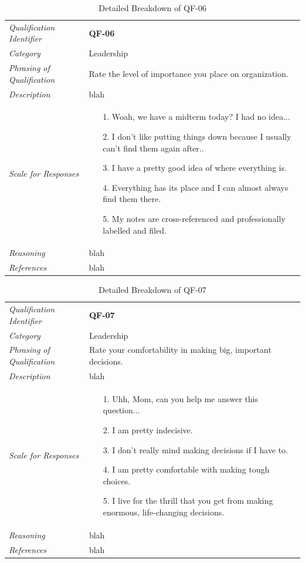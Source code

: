 \documentclass[12pt,letterpaper]{article}
\begin{document}
\begin{table}[H]
	\caption{Detailed Breakdown of QF-06}
	\begin{tabu} to 
		\toprule
		Qualification Identifier & {\bf QF-06}\\
		Category & Leadership \\
		Phrasing of Qualification & Rate the level of importance you place on organization.\\
		Description & blah\\
		Scale for Responses &
		\begin{minipage}[t]{\linewidth}
			\begin{enumerate}
				\item[1.] Woah, we have a midterm today? I had no idea...
				\item[2.] I don't like putting things down because I usually can't find them again after..
				\item[3.] I have a pretty good idea of where everything is.
				\item[4.] Everything has its place and I can almost always find them there.
				\item[5.] My notes are cross-referenced and professionally labelled and filed.
			\end{enumerate}
		\end{minipage}\\
		Reasoning & blah\\
		References & blah\\
		\toprule
	\end{tabu}
\end{table}

\begin{table}[H]
	\caption{Detailed Breakdown of QF-07}
	\begin{tabu} to 
		\toprule
		Qualification Identifier & {\bf QF-07}\\
		Category & Leadership \\
		Phrasing of Qualification & Rate your comfortability in making big, important decisions. \\
		Description & blah\\
		Scale for Responses &
		\begin{minipage}[t]{\linewidth}
			\begin{enumerate}
				\item[1.] Uhh, Mom, can you help me answer this question...
				\item[2.] I am pretty indecisive.
				\item[3.] I don't really mind making decisions if I have to.
				\item[4.] I am pretty comfortable with making tough choices.
				\item[5.] I live for the thrill that you get from making enormous, life-changing decisions.
			\end{enumerate}
		\end{minipage}\\
		Reasoning & blah\\
		References & blah\\
		\toprule
	\end{tabu}
\end{table}
\end{document}
